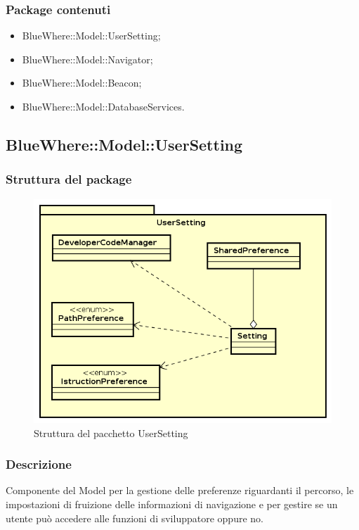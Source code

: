 \documentclass[../SpecificaTecnica.tex]{subfiles}
\begin{document}
		\subsubsection{Package contenuti}
			\begin{itemize}
				\item BlueWhere::Model::UserSetting;
				\item BlueWhere::Model::Navigator;
				\item BlueWhere::Model::Beacon;
				\item BlueWhere::Model::DatabaseServices.
			\end{itemize}
			\newpage
	\subsection{BlueWhere::Model::UserSetting}
		\subsubsection{Struttura del package}
			\begin{figure}[!h]
				\centering
				\includegraphics[scale=0.6]{diagrammi/UserSetting.png}
					\caption{Struttura del pacchetto UserSetting}
				\label{fig:Struttura_MVP}
			\end{figure} 
		\subsubsection{Descrizione}
			Componente del Model per la gestione delle preferenze riguardanti il percorso, le impostazioni di fruizione delle informazioni di navigazione e per gestire se un utente può accedere alle funzioni di sviluppatore oppure no.
\end{document}
